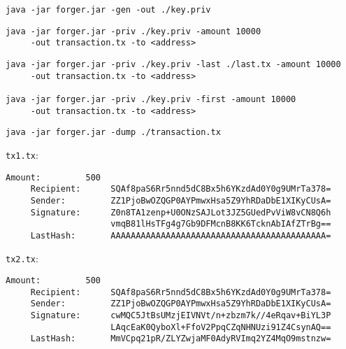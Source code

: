 \documentclass[../documentation.tex]{subfiles}
\begin{document}
\begin{lstlisting}[style=generic]
java -jar forger.jar -gen -out ./key.priv
\end{lstlisting}

\begin{lstlisting}[style=generic]
java -jar forger.jar -priv ./key.priv -amount 10000
     -out transaction.tx -to <address>
\end{lstlisting}

\begin{lstlisting}[style=generic]
java -jar forger.jar -priv ./key.priv -last ./last.tx -amount 10000
     -out transaction.tx -to <address>

java -jar forger.jar -priv ./key.priv -first -amount 10000
     -out transaction.tx -to <address>
\end{lstlisting}

\begin{lstlisting}[style=generic]
java -jar forger.jar -dump ./transaction.tx
\end{lstlisting}


\texttt{tx1.tx}:

\begin{lstlisting}[style=generic]
     Amount:         500
     Recipient:      SQAf8paS6Rr5nnd5dC8Bx5h6YKzdAd0Y0g9UMrTa378=
     Sender:         ZZ1PjoBwOZQGP0AYPmwxHsa5Z9YhRDaDbE1XIKyCUsA=
     Signature:      Z0n8TA1zenp+U0ONzSAJLot3JZ5GUedPvViW8vCN8Q6h
                     vmqB81lHsTFg4g7Gb9DFMcnB8KK6TcknAbIAfZTrBg==
     LastHash:       AAAAAAAAAAAAAAAAAAAAAAAAAAAAAAAAAAAAAAAAAAA=
\end{lstlisting}

\texttt{tx2.tx}:

\begin{lstlisting}[style=generic]
     Amount:         500
     Recipient:      SQAf8paS6Rr5nnd5dC8Bx5h6YKzdAd0Y0g9UMrTa378=
     Sender:         ZZ1PjoBwOZQGP0AYPmwxHsa5Z9YhRDaDbE1XIKyCUsA=
     Signature:      cwMQC5JtBsUMzjEIVNVt/n+zbzm7k//4eRqav+BiYL3P
                     LAqcEaK0QyboXl+FfoV2PpqCZqNHNUzi91Z4CsynAQ==
     LastHash:       MmVCpq21pR/ZLYZwjaMF0AdyRVImq2YZ4MqO9mstnzw=
\end{lstlisting}
\end{document}
